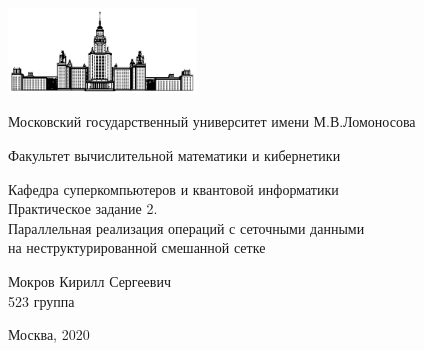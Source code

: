 \begin{titlepage}
	\begin{center}
		\includegraphics[width=50mm]{./images/MSU}

	    Московский государственный университет имени М.В.Ломоносова

	    Факультет вычислительной математики и кибернетики

	    Кафедра суперкомпьютеров и квантовой информатики\\[20mm]


	    {Практическое задание 2.\\Параллельная реализация операций с сеточными данными\\на неструктурированной смешанной сетке }\\[35mm]

	    \begin{flushright}
	            
	            Мокров Кирилл Сергеевич\\
	            523 группа\\
	            
	    \end{flushright}
	       

	    \vspace{\fill}
	    Москва, 2020
	\end{center}
\end{titlepage}

\clearpage
